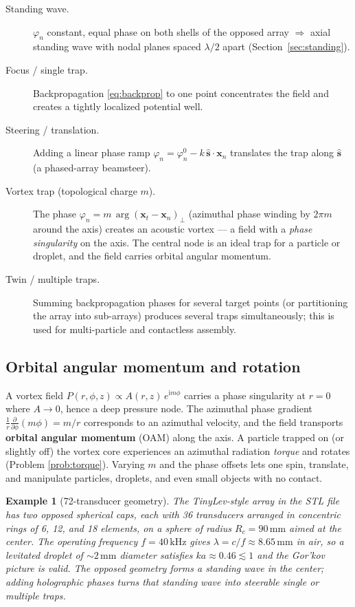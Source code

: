 \documentclass[11pt]{article}
\newtheorem{example}{Example}[section]
\newcommand{\ii}{\mathrm{i}}
\newcommand{\xx}{\mathbf{x}}
\newcommand{\bs}{\mathbf{s}}
\begin{document}
\begin{description}
  \item[Standing wave.] $\varphi_{n}$ constant, equal phase on both shells of the
  opposed array $\Rightarrow$ axial standing wave with nodal planes spaced
  $\lambda/2$ apart (Section~\ref{sec:standing}).
  \item[Focus / single trap.] Backpropagation \eqref{eq:backprop} to one point
  concentrates the field and creates a tightly localized potential well.
  \item[Steering / translation.] Adding a linear phase ramp
  $\varphi_{n}=\varphi_{n}^{0}-k\,\hat{\bs}\cdot\xx_{n}$ translates the trap
  along $\hat{\bs}$ (a phased-array beamsteer).
  \item[Vortex trap (topological charge $m$).] The phase
  $\varphi_{n}=m\,\arg(\xx_{t}-\xx_{n})_{\perp}$ (azimuthal phase winding by
  $2\pi m$ around the axis) creates an acoustic vortex --- a field with a
  \emph{phase singularity} on the axis. The central node is an ideal trap for a
  particle or droplet, and the field carries orbital angular momentum.
  \item[Twin / multiple traps.] Summing backpropagation phases for several target
  points (or partitioning the array into sub-arrays) produces several traps
  simultaneously; this is used for multi-particle and contactless assembly.
\end{description}

\subsection{Orbital angular momentum and rotation}

A vortex field $P(r,\phi,z)\propto A(r,z)\,e^{\ii m\phi}$ carries a phase
singularity at $r=0$ where $A\to0$, hence a deep pressure node. The azimuthal
phase gradient $\frac1r\frac{\partial}{\partial\phi}(m\phi)=m/r$ corresponds to
an azimuthal velocity, and the field transports \textbf{orbital angular momentum}
(OAM) along the axis. A particle trapped on (or slightly off) the vortex core
experiences an azimuthal radiation \emph{torque} and rotates (Problem
\ref{prob:torque}). Varying $m$ and the phase offsets lets one spin, translate,
and manipulate particles, droplets, and even small objects with no contact.

\begin{example}[72-transducer geometry]
The TinyLev-style array in the STL file has two opposed spherical caps, each with
36 transducers arranged in concentric rings of 6, 12, and 18 elements, on a
sphere of radius $R_{c}=90\,\mathrm{mm}$ aimed at the center. The operating
frequency $f=40\,\mathrm{kHz}$ gives $\lambda=c/f\approx8.65\,\mathrm{mm}$ in
air, so a levitated droplet of $\sim2\,\mathrm{mm}$ diameter satisfies
$ka\approx0.46\lesssim1$ and the Gor'kov picture is valid. The opposed geometry
forms a standing wave in the center; adding holographic phases turns that
standing wave into steerable single or multiple traps.
\end{example}
\end{document}
